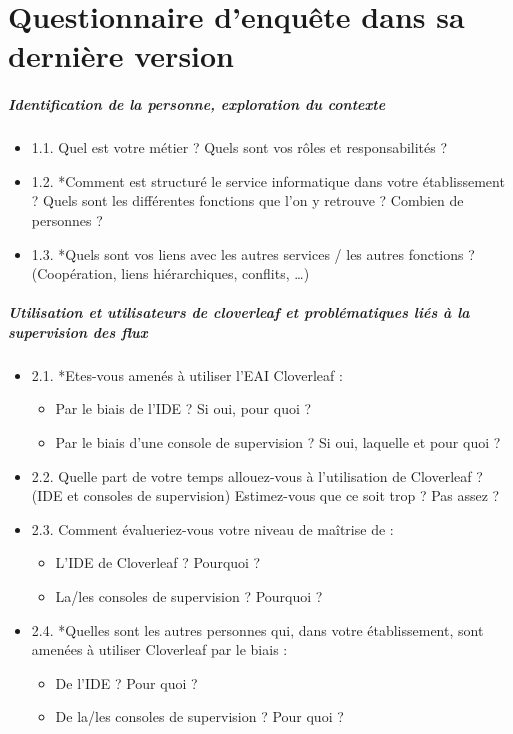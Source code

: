 \tocless\chapter{Questionnaire d'enquête dans sa dernière version}
	\paragraph{Identification de la personne, exploration du contexte}
	\begin{itemize}
	  \item 1.1. Quel est votre métier ? Quels sont vos rôles et responsabilités ?
	  \item 1.2. *Comment est structuré le service informatique dans votre
	  établissement ? Quels sont les différentes fonctions que l’on y retrouve ? Combien de personnes ?
	  \item 1.3. *Quels sont vos liens avec les autres services / les autres
	  fonctions ? (Coopération, liens hiérarchiques, conflits, …)
	\end{itemize}
	
	\paragraph{Utilisation et utilisateurs de cloverleaf et problématiques liés à la
	supervision des flux}
	\begin{itemize}
	  \item 2.1. *Etes-vous amenés à utiliser l’EAI Cloverleaf :
	  	\begin{itemize}
	  	  \item Par le biais de l’IDE ? Si oui, pour quoi ?
	  	  \item Par le biais d’une console de supervision ? Si oui, laquelle et pour
	  	  quoi ?
	  	\end{itemize}
	   \item 2.2. Quelle part de votre temps allouez-vous à l’utilisation de
	   Cloverleaf ? (IDE et consoles de supervision) Estimez-vous que ce soit trop ? Pas assez ?
	   \item 2.3. Comment évalueriez-vous votre niveau de maîtrise de :
	   	\begin{itemize}
	  	  \item L’IDE de Cloverleaf ? Pourquoi ?
	  	  \item La/les consoles de supervision ? Pourquoi ?
	  	\end{itemize}
	   \item 2.4. *Quelles sont les autres personnes qui, dans votre établissement,
	   sont amenées à utiliser Cloverleaf par le biais :
	   	\begin{itemize}
	  	  \item De l’IDE ? Pour quoi ?
	  	  \item De la/les consoles de supervision ? Pour quoi ?
	  	\end{itemize}
	\end{itemize}
	
